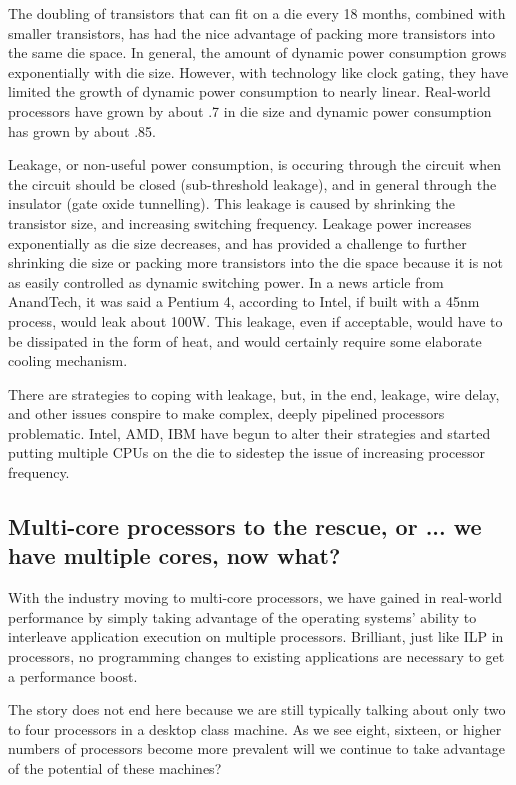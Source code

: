 \documentclass[12pt,twoside,letterpaper]{article}
\begin{document}
The doubling of transistors that can fit on a die every 18 months, combined with smaller transistors, has had the nice advantage of packing more transistors into the same die space. In general, the amount of dynamic power consumption grows exponentially with die size. However, with technology like clock gating, they have limited the growth of dynamic power consumption to nearly linear. Real-world processors have grown by about .7 in die size and dynamic power consumption has grown by about .85. 

Leakage, or non-useful power consumption, is occuring through the circuit when the circuit should be closed (sub-threshold leakage), and in general through the insulator (gate oxide tunnelling). This leakage is caused by shrinking the transistor size, and increasing switching frequency. Leakage power increases exponentially as die size decreases, and has provided a challenge to further shrinking die size or packing more transistors into the die space because it is not as easily controlled as dynamic switching power. In a news article from AnandTech, it was said a Pentium 4, according to Intel, if built with a 45nm process, would leak about 100W. This leakage, even if acceptable, would have to be dissipated in the form of heat, and would certainly require some elaborate cooling mechanism.

There are strategies to coping with leakage, but, in the end, leakage, wire delay, and other issues conspire to make complex, deeply pipelined processors problematic. Intel, AMD, IBM have begun to alter their strategies and started putting multiple CPUs on the die to sidestep the issue of increasing processor frequency.

\subsection*{Multi-core processors to the rescue, or ... we have multiple cores, now what?}
With the industry moving to multi-core processors, we have gained in real-world performance by simply taking advantage of the operating systems' ability to interleave application execution on multiple processors. Brilliant, just like ILP in processors, no programming changes to existing applications are necessary to get a performance boost.

The story does not end here because we are still typically talking about only two to four processors in a desktop class machine. As we see eight, sixteen, or higher numbers of processors become more prevalent will we continue to take advantage of the potential of these machines?
\end{document}
